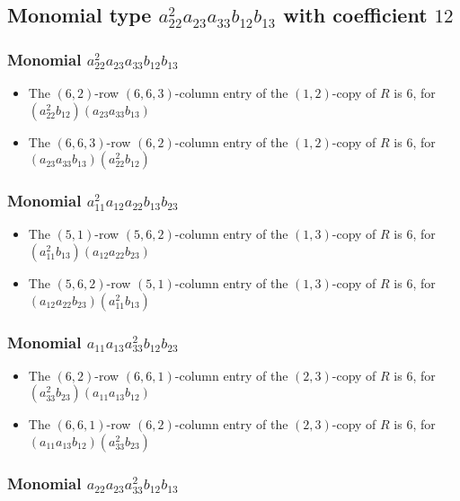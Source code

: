 \documentclass{article}
\begin{document}
\subsection{Monomial type $ a_{22}^{2} a_{23} a_{33} b_{12} b_{13} $ with coefficient $ 12 $}

\subsubsection{Monomial $ a_{22}^{2} a_{23} a_{33} b_{12} b_{13} $}

\begin{itemize}
\item The $(6, 2)$-row $(6, 6, 3)$-column entry of the $ \left(1, 2\right) $-copy of $R$ is $ 6 $, for $( a_{22}^{2} b_{12} )( a_{23} a_{33} b_{13} )$ 
\item The $(6, 6, 3)$-row $(6, 2)$-column entry of the $ \left(1, 2\right) $-copy of $R$ is $ 6 $, for $( a_{23} a_{33} b_{13} )( a_{22}^{2} b_{12} )$ 
\end{itemize}
\subsubsection{Monomial $ a_{11}^{2} a_{12} a_{22} b_{13} b_{23} $}

\begin{itemize}
\item The $(5, 1)$-row $(5, 6, 2)$-column entry of the $ \left(1, 3\right) $-copy of $R$ is $ 6 $, for $( a_{11}^{2} b_{13} )( a_{12} a_{22} b_{23} )$ 
\item The $(5, 6, 2)$-row $(5, 1)$-column entry of the $ \left(1, 3\right) $-copy of $R$ is $ 6 $, for $( a_{12} a_{22} b_{23} )( a_{11}^{2} b_{13} )$ 
\end{itemize}
\subsubsection{Monomial $ a_{11} a_{13} a_{33}^{2} b_{12} b_{23} $}

\begin{itemize}
\item The $(6, 2)$-row $(6, 6, 1)$-column entry of the $ \left(2, 3\right) $-copy of $R$ is $ 6 $, for $( a_{33}^{2} b_{23} )( a_{11} a_{13} b_{12} )$ 
\item The $(6, 6, 1)$-row $(6, 2)$-column entry of the $ \left(2, 3\right) $-copy of $R$ is $ 6 $, for $( a_{11} a_{13} b_{12} )( a_{33}^{2} b_{23} )$ 
\end{itemize}
\subsubsection{Monomial $ a_{22} a_{23} a_{33}^{2} b_{12} b_{13} $}
\end{document}
